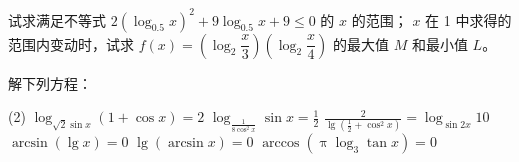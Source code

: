 \begin{Exercise}
\begin{question}
\begin{tasks}
    \task 试求满足不等式 $2(\log_{0.5}x)^2+9\log_{0.5}x+9\leqslant 0$ 的 $x$ 的范围；
    \task $x$ 在 1 中求得的范围内变动时，试求 $f(x)=\left(\log_2 \dfrac{x}{3}\right)\left(\log_2 \dfrac{x}{4}\right)$ 的最大值 $M$ 和最小值 $L$。
  \end{tasks}
  \item 解下列方程：
  \begin{tasks}(2)
    \task $\displaystyle \log_{\sqrt{2}\sin x}(1+\cos x)=2$
    \task $\displaystyle \log_{\frac{1}{8\cos^2 x}}\sin x=\frac{1}{2}$
    \task $\displaystyle \frac{2}{\lg\left(\frac{1}{2}+\cos^2 x\right)}=\log_{\sin 2x}10$
    \task $\displaystyle \arcsin(\lg x)=0$
    \task $\displaystyle \lg(\arcsin x)=0$
    \task $\displaystyle \arccos(\uppi\log_3\tan x)=0$
  \end{tasks}
\end{question}
\end{Exercise}